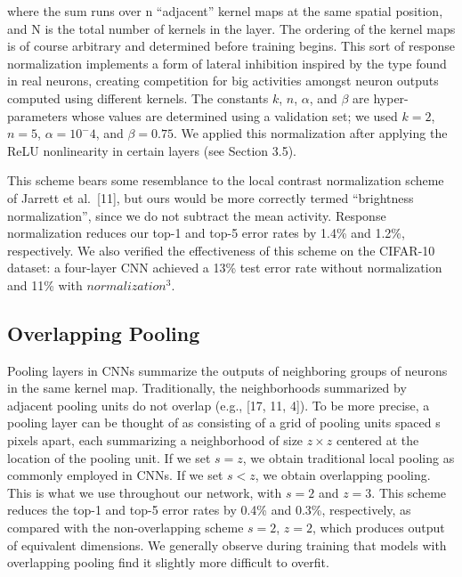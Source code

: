 \documentclass[12pt,a4paper,UTF8,twoside]{book}
\begin{document}
where the sum runs over n ``adjacent'' kernel maps at the same spatial position, and N is the total number of kernels in the layer. The ordering of the kernel maps is of course arbitrary and determined before training begins. This sort of response normalization implements a form of lateral inhibition inspired by the type found in real neurons, creating competition for big activities amongst neuron outputs computed using different kernels. The constants \(k\), \(n\), \(\alpha\), and \(\beta\) are hyper-parameters whose values are determined using a validation set; we used \(k = 2\), \(n = 5\), \(\alpha = 10^−4\), and \(\beta = 0.75\). We applied this normalization after applying the ReLU nonlinearity in certain layers (see Section 3.5).

This scheme bears some resemblance to the local contrast normalization scheme of Jarrett et al.~{[}11{]}, but ours would be more correctly termed ``brightness normalization'', since we do not subtract the mean activity. Response normalization reduces our top-1 and top-5 error rates by 1.4\% and 1.2\%, respectively. We also verified the effectiveness of this scheme on the CIFAR-10 dataset: a four-layer CNN achieved a 13\% test error rate without normalization and 11\% with \(normalization^3\).

\hypertarget{overlapping-pooling}{%
\subsection{Overlapping Pooling}\label{overlapping-pooling}}

Pooling layers in CNNs summarize the outputs of neighboring groups of neurons in the same kernel map. Traditionally, the neighborhoods summarized by adjacent pooling units do not overlap (e.g., {[}17, 11, 4{]}). To be more precise, a pooling layer can be thought of as consisting of a grid of pooling units spaced s pixels apart, each summarizing a neighborhood of size \(z × z\) centered at the location of the pooling unit. If we set \(s = z\), we obtain traditional local pooling as commonly employed in CNNs. If we set \(s < z\), we obtain overlapping pooling. This is what we use throughout our network, with \(s = 2\) and \(z = 3\). This scheme reduces the top-1 and top-5 error rates by 0.4\% and 0.3\%, respectively, as compared with the non-overlapping scheme \(s = 2\), \(z = 2\), which produces output of equivalent dimensions. We generally observe during training that models with overlapping pooling find it slightly more difficult to overfit.
\end{document}
